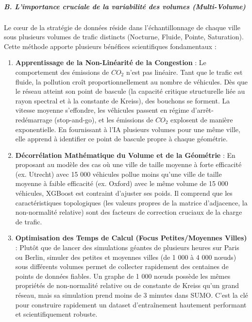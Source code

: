 \documentclass[10pt, a4paper]{article}
\providecommand{\tightlist}{}
\begin{document}
\subparagraph{B. L'importance cruciale de la variabilité des volumes
(Multi-Volume)}\label{b.-limportance-cruciale-de-la-variabilituxe9-des-volumes-multi-volume}

Le cœur de la stratégie de données réside dans l'échantillonnage de
chaque ville sous plusieurs volumes de trafic distincts (Nocturne,
Fluide, Pointe, Saturation). Cette méthode apporte plusieurs bénéfices
scientifiques fondamentaux :

\begin{enumerate}
\def\labelenumi{\arabic{enumi}.}
\tightlist
\item
  \textbf{Apprentissage de la Non-Linéarité de la Congestion} : Le
  comportement des émissions de \(CO_2\) n'est pas linéaire. Tant que le
  trafic est fluide, la pollution croît proportionnellement au nombre de
  véhicules. Dès que le réseau atteint son point de bascule (la capacité
  critique structurelle liée au rayon spectral et à la constante de
  Kreiss), des bouchons se forment. La vitesse moyenne s'effondre, les
  véhicules passent en régime d'arrêt-redémarrage (stop-and-go), et les
  émissions de \(CO_2\) explosent de manière exponentielle. En
  fournissant à l'IA plusieurs volumes pour une même ville, elle apprend
  à identifier ce point de bascule propre à chaque géométrie.
\item
  \textbf{Décorrélation Mathématique du Volume et de la Géométrie} : En
  proposant au modèle des cas où une ville de taille moyenne à forte
  efficacité (ex. Utrecht) avec 15 000 véhicules pollue moins qu'une
  ville de taille moyenne à faible efficacité (ex. Oxford) avec le même
  volume de 15 000 véhicules, XGBoost est contraint d'ajuster ses poids.
  Il comprend que les caractéristiques topologiques (les valeurs propres
  de la matrice d'adjacence, la non-normalité relative) sont des
  facteurs de correction cruciaux de la charge de trafic.
\item
  \textbf{Optimisation des Temps de Calcul (Focus Petites/Moyennes
  Villes)} : Plutôt que de lancer des simulations géantes de plusieurs
  heures sur Paris ou Berlin, simuler des petites et moyennes villes (de
  1 000 à 4 000 nœuds) sous différents volumes permet de collecter
  rapidement des centaines de points de données fiables. Un graphe de 1
  000 nœuds possède les mêmes propriétés de non-normalité relative ou de
  constante de Kreiss qu'un grand réseau, mais sa simulation prend moins
  de 3 minutes dans SUMO. C'est la clé pour construire rapidement un
  dataset d'entraînement hautement performant et scientifiquement
  robuste.
\end{enumerate}
\end{document}
